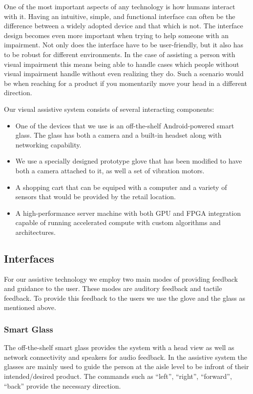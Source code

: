 One of the most important aspects of any technology is how humans interact with it.
Having an intuitive, simple, and functional interface can often be the difference between
a widely adopted device and that which is not. The interface design becomes even more important
when trying to help someone with an impairment. Not only does the interface have to be user-friendly, 
but it also has to be robust for different environments. 
In the case of assisting a person with visual impairment this means being able to handle cases
which people without visual impairment handle without even realizing they do. 
Such a scenario would be when reaching for a product if you momentarily move your head in a different direction.

Our visual assistive system consists of several interacting components: 

\begin{itemize}
\item One of the devices that we use is an off-the-shelf Android-powered smart glass. 
The glass has both a camera and a built-in headset along with
networking capability. 
\item We use a specially designed prototype glove that has been
modified to have both a camera attached to it, as well a set of
vibration motors. 
\item A shopping cart that can be equiped with a computer
and a variety of sensors that would be provided by the retail location.
\item A high-performance server machine with both GPU and FPGA integration capable of running
accelerated compute with custom algorithms and architectures.
\end{itemize}
\subsection{Interfaces}
For our assistive technology we employ two main modes of providing feedback and guidance to the user. These modes are auditory feedback and tactile feedback. 
To provide this feedback to the users we use the glove and the glass as mentioned above.
\subsubsection{Smart Glass}
The off-the-shelf smart glass provides the system with a head view as well as 
network connectivity and speakers for audio feedback.
In the assistive system the glasses are mainly used to guide the person at the aisle level
to be infront of their intended/desired product. The commands such as ``left'', ``right'', ``forward'', ``back''
provide the necessary direction. 
